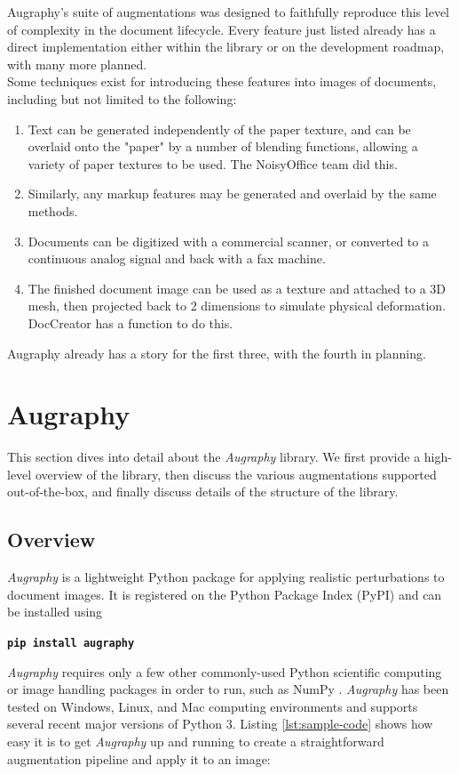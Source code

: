 \documentclass[runningheads]{llncs}
\begin{document}
Augraphy's suite of augmentations was designed to faithfully reproduce this level of complexity in the document lifecycle. Every feature just listed already has a direct implementation either within the library or on the development roadmap, with many more planned.\\

Some techniques exist for introducing these features into images of documents, including but not limited to the following:
\begin{enumerate}
\item Text can be generated independently of the paper texture, and can be overlaid onto the "paper" by a number of blending functions, allowing a variety of paper textures to be used. The NoisyOffice team did this.
\item Similarly, any markup features may be generated and overlaid by the same methods.
\item Documents can be digitized with a commercial scanner, or converted to a continuous analog signal and back with a fax machine.
\item The finished document image can be used as a texture and attached to a 3D mesh, then projected back to 2 dimensions to simulate physical deformation. DocCreator has a function to do this.
\end{enumerate}

Augraphy already has a story for the first three, with the fourth in planning.

\section{Augraphy}
This section dives into detail about the \emph{Augraphy} library.
We first provide a high-level overview of the library, then discuss the various augmentations supported out-of-the-box, and finally discuss details of the structure of the library.

\subsection{Overview}

\emph{Augraphy} is a lightweight Python package for applying realistic perturbations to document images.
It is registered on the Python Package Index (PyPI) and can be installed using
\begin{center}
\textbf{\texttt{pip install augraphy}}
\end{center}
\emph{Augraphy} requires only a few other commonly-used Python scientific computing or image handling packages in order to run, such as NumPy \cite{numpy}. \emph{Augraphy} has been tested on Windows, Linux, and Mac computing environments and supports several recent major versions of Python 3. Listing \ref{lst:sample-code} shows how easy it is to get \emph{Augraphy} up and running to create a straightforward augmentation pipeline and apply it to an image:
\end{document}
